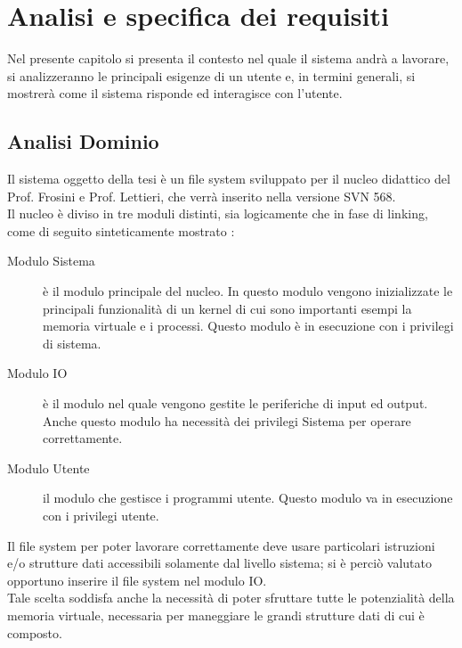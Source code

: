 \chapter{Analisi e specifica dei requisiti}
\label{cap:Requisiti}
Nel presente capitolo si presenta il contesto nel quale il sistema andrà a lavorare, 
si analizzeranno le principali esigenze di un utente e, in termini generali, si mostrerà come il sistema risponde ed interagisce con l'utente. 

\section{Analisi Dominio}
Il  sistema  oggetto della tesi è un file system sviluppato per il nucleo didattico del Prof. Frosini e Prof. Lettieri, che verrà inserito nella versione SVN 568.\\
Il nucleo è diviso in tre moduli distinti, sia logicamente che in fase di linking, come di seguito sinteticamente mostrato : 
\begin{description}
 \item[Modulo Sistema]
  è il modulo principale del nucleo. In questo modulo vengono inizializzate le principali funzionalità di un kernel di cui sono importanti esempi la memoria virtuale e i processi.
  Questo modulo è in esecuzione con i privilegi di sistema. 
 \end{description}
 \begin{description}
  \item[Modulo IO]
  è il modulo nel quale vengono gestite le periferiche di input ed output. Anche questo modulo ha necessità dei privilegi Sistema per operare correttamente. 
  \end{description}
  \begin{description}
   \item[Modulo Utente]
  il modulo che gestisce i programmi utente. Questo modulo va in esecuzione con i privilegi utente. 
   \end{description}
Il file system per poter lavorare correttamente deve usare particolari istruzioni e/o strutture dati accessibili solamente dal livello sistema; si è perciò valutato opportuno inserire il file system nel modulo IO.\\ 
Tale scelta soddisfa anche la necessità di poter sfruttare tutte le potenzialità della memoria virtuale, necessaria per maneggiare le grandi strutture dati di cui è composto.

